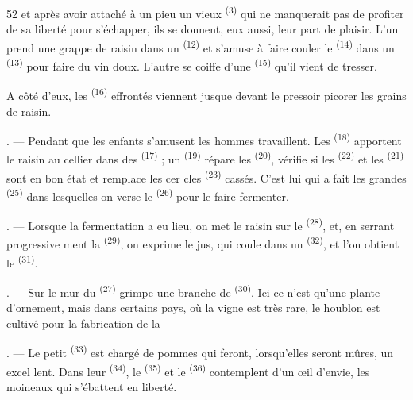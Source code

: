 \begin{VUpage}[54]{52}
\VUcontinue
et après avoir attaché à un pieu un vieux  \textsuperscript{(3)} qui\nl
ne manquerait pas de profiter de sa liberté pour\nl
s'échapper, ils se donnent, eux aussi, leur part de\nl
plaisir. L'un prend une grappe de raisin dans un\nl
{} \textsuperscript{(12)} et s'amuse à faire couler le\nl
{} \textsuperscript{(14)} dans un  \textsuperscript{(13)} pour faire du vin doux.\nl
L'autre se coiffe d'une  \textsuperscript{(15)}\nl
qu'il vient de tresser.

\VUblancAlinea
A côté d'eux, les  \textsuperscript{(16)} effrontés viennent\nl
jusque devant le pressoir picorer les grains de raisin.

. --- Pendant que les enfants s'amusent les hommes\nl
travaillent. Les  \textsuperscript{(18)} apportent le raisin\nl
au cellier dans des  \textsuperscript{(17)} ; un  \textsuperscript{(19)}\nl
répare les  \textsuperscript{(20)}, vérifie si les  \textsuperscript{(22)} et\nl
les  \textsuperscript{(21)} sont en bon état et remplace les cer\cc
cles \textsuperscript{(23)} cassés. C'est lui qui a fait les grandes  \textsuperscript{(25)}\nl
dans lesquelles on verse le  \textsuperscript{(26)} pour le faire\nl
fermenter.

. --- Lorsque la fermentation a eu lieu, on met le\nl
raisin sur le  \textsuperscript{(28)}, et, en serrant progressive\cc
ment la  \textsuperscript{(29)}, on exprime le jus, qui coule dans un\nl
{} \textsuperscript{(32)}, et l'on obtient le  \textsuperscript{(31)}.

. --- Sur le mur du  \textsuperscript{(27)} grimpe une branche\nl
de  \textsuperscript{(30)}. Ici ce n'est qu'une plante d'ornement,\nl
mais dans certains pays, où la vigne est très rare, le\nl
houblon est cultivé pour la fabrication de la 

. --- Le petit  \textsuperscript{(33)} est chargé de pommes\nl
qui feront, lorsqu'elles seront mûres, un  excel\cc
lent. Dans leur  \textsuperscript{(34)}, le  \textsuperscript{(35)} et le \cc
{} \textsuperscript{(36)} contemplent d'un œil d'envie, les moineaux\nl
qui s'ébattent en liberté.


\end{VUpage}
